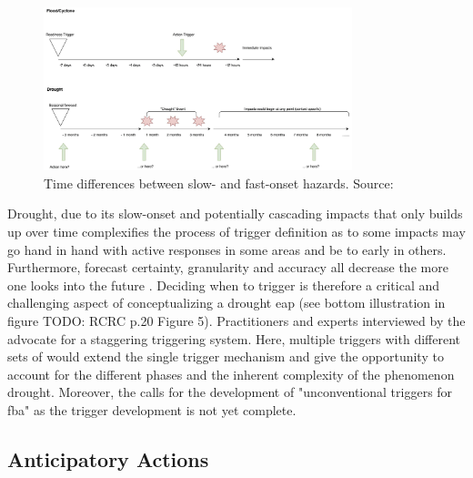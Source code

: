 \begin{figure}[!htp]
    \centering
    \includegraphics[width=0.8\textwidth]{figures/2023_MA_th_slow_onset.jpg}
    \decoRule
    \caption[Time differences between slow- and fast-onset hazards]{Time differences between slow- and fast-onset hazards. Source: \autocite{rcrcFORECASTBASEDFINANCINGEARLY2020}}
    \label{fig:th_}
\end{figure}

Drought, due to its slow-onset and potentially cascading impacts that only builds up over time complexifies the process of trigger definition as  to some impacts may go hand in hand with active responses in some areas and be to early in others. Furthermore, forecast certainty, granularity and accuracy all decrease the more one looks into the future \autocite{rcrcFORECASTBASEDFINANCINGEARLY2020}. Deciding when to trigger is therefore a critical and challenging aspect of conceptualizing a drought \acrshort{eap} (see bottom illustration in figure TODO: RCRC p.20 Figure 5). Practitioners and experts interviewed by the \autocite{rcrcFORECASTBASEDFINANCINGEARLY2020} advocate for a staggering triggering system. Here, multiple triggers with different sets of  would extend the single trigger mechanism and give the opportunity to account for the different phases and the inherent complexity of the phenomenon drought. Moreover, the \autocite[30]{rcrcFORECASTBASEDFINANCINGEARLY2020} calls for the development of "unconventional triggers for \acrfull{fba}" as the trigger development is not yet complete.

\subsection{Anticipatory Actions}

